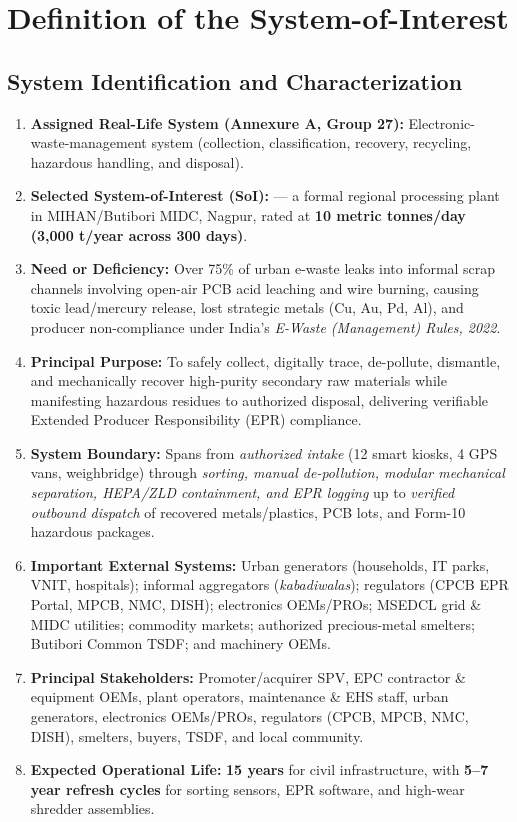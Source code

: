 \section{Definition of the System-of-Interest}
\label{sec:A}

\subsection{System Identification and Characterization}

\begin{enumerate}
    \item \textbf{Assigned Real-Life System (Annexure A, Group 27):} Electronic-waste-management system (collection, classification, recovery, recycling, hazardous handling, and disposal).
    \item \textbf{Selected System-of-Interest (SoI):} \textbf{\systemOfInterest} --- a formal regional processing plant in MIHAN/Butibori MIDC, Nagpur, rated at \textbf{10 metric tonnes/day (3,000 t/year across 300 days)}.
    \item \textbf{Need or Deficiency:} Over 75\% of urban e-waste leaks into informal scrap channels involving open-air PCB acid leaching and wire burning, causing toxic lead/mercury release, lost strategic metals (Cu, Au, Pd, Al), and producer non-compliance under India's \textit{E-Waste (Management) Rules, 2022}.
    \item \textbf{Principal Purpose:} To safely collect, digitally trace, de-pollute, dismantle, and mechanically recover high-purity secondary raw materials while manifesting hazardous residues to authorized disposal, delivering verifiable Extended Producer Responsibility (EPR) compliance.
    \item \textbf{System Boundary:} Spans from \textit{authorized intake} (12 smart kiosks, 4 GPS vans, weighbridge) through \textit{sorting, manual de-pollution, modular mechanical separation, HEPA/ZLD containment, and EPR logging} up to \textit{verified outbound dispatch} of recovered metals/plastics, PCB lots, and Form-10 hazardous packages.
    \item \textbf{Important External Systems:} Urban generators (households, IT parks, VNIT, hospitals); informal aggregators (\textit{kabadiwalas}); regulators (CPCB EPR Portal, MPCB, NMC, DISH); electronics OEMs/PROs; MSEDCL grid \& MIDC utilities; commodity markets; authorized precious-metal smelters; Butibori Common TSDF; and machinery OEMs.
    \item \textbf{Principal Stakeholders:} Promoter/acquirer SPV, EPC contractor \& equipment OEMs, plant operators, maintenance \& EHS staff, urban generators, electronics OEMs/PROs, regulators (CPCB, MPCB, NMC, DISH), smelters, buyers, TSDF, and local community.
    \item \textbf{Expected Operational Life:} \textbf{15 years} for civil infrastructure, with \textbf{5--7 year refresh cycles} for sorting sensors, EPR software, and high-wear shredder assemblies.
\end{enumerate}

